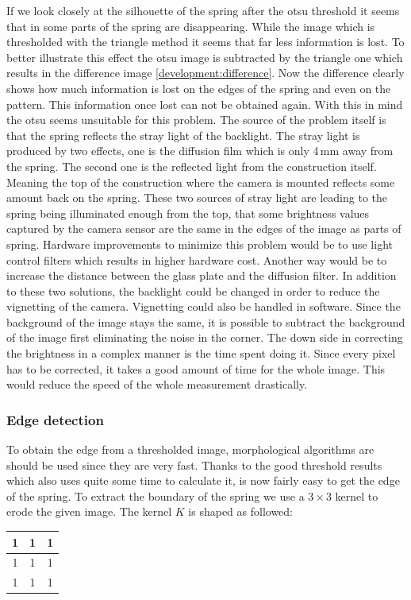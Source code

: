 If we look closely at the silhouette of the spring after the otsu threshold it seems that in some parts of the spring are disappearing. While the image which is thresholded with the triangle method it seems that far less information is lost. To better illustrate this effect the otsu image is subtracted by the triangle one which results in the difference image \ref{development:difference}.  
Now the difference clearly shows how much information is lost on the edges of the spring and even on the pattern. This information once lost can not be obtained again. With this in mind the otsu seems unsuitable for this problem.
The source of the problem itself is that the spring reflects the stray light of the backlight. The stray light is produced by two effects, one is the diffusion film which is only 4\,mm away from the spring. The second one is the reflected light from the construction itself. Meaning the top of the construction where the camera is mounted reflects some amount back on the spring. These two sources of stray light are leading to the spring being illuminated enough from the top, that some brightness values captured by the camera sensor are the same in the edges of the image as parts of spring.
Hardware improvements to minimize this problem would be to use light control filters which results in higher hardware cost. Another way would be to increase the distance between the glass plate and the diffusion filter.
In addition to these two solutions, the backlight could be changed in order to reduce the vignetting of the camera.
Vignetting could also be handled in software.
Since the background of the image stays the same, it is possible to subtract the background of the image first eliminating the noise in the corner. The down side in correcting the brightness in a complex manner is the time spent doing it.
Since every pixel has to be corrected, it takes a good amount of time for the whole image.
This would reduce the speed of the whole measurement drastically.

\subsubsection{Edge detection}   
To obtain the edge from a thresholded image, morphological algorithms are should be used since they are very fast. Thanks to the good threshold results which also uses quite some time to calculate it, is now fairly easy to get the edge of the spring. To extract the boundary of the spring we use a $3\times 3$ kernel to erode the given image. The kernel $K$ is shaped as followed:
\begin{center}
	\setlength{\tabcolsep}{0.5em} %
	{\renewcommand{\arraystretch}{1.2}
		\begin{tabular}{|c|c|c|}
			\hline
			1&1&1\\
			\hline
			1&1&1\\
			\hline
			1&1&1\\
			\hline
		\end{tabular}
	}
\end{center}

